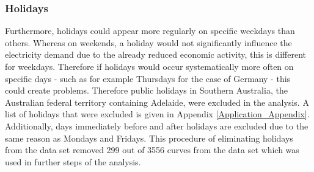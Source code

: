 \documentclass[12pt, a4paper]{article}
\theoremstyle{MAstyle} \newtheorem{assumption}{Assumption}[section]
\theoremstyle{MAstyle} \newtheorem{definition}{Definition}[section]
\theoremstyle{MAstyle} \newtheorem{theorem}{Theorem}[section]
\begin{document}
			\subsubsection{Holidays}
			Furthermore, holidays could appear more regularly on specific weekdays than others. Whereas on weekends, a holiday would not significantly influence the electricity demand due to the already reduced economic activity, this is different for weekdays. Therefore if holidays would occur systematically more often on specific days - such as for example Thursdays for the case of Germany - this could create problems. Therefore public holidays in Southern Australia, the Australian federal territory containing Adelaide, were excluded in the analysis. A list of holidays that were excluded is given in Appendix \ref{Application_Appendix}. Additionally, days immediately before and after holidays are excluded due to the same reason as Mondays and Fridays. This procedure of eliminating holidays from the data set removed 299 out of 3556 curves from the data set which was used in further steps of the analysis. \\
			
\end{document}
